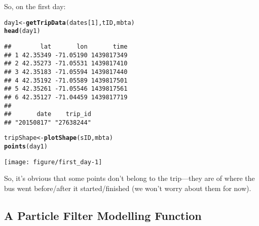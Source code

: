 \documentclass[11pt]{article}\usepackage[]{graphicx}\usepackage[]{color}
\makeatletter
\def\maxwidth{ %
  \ifdim\Gin@nat@width>\linewidth
    \linewidth
  \else
    \Gin@nat@width
  \fi
}
\newcommand{\hlnum}[1]{\textcolor[rgb]{0.686,0.059,0.569}{#1}}%
\newcommand{\hlstd}[1]{\textcolor[rgb]{0.345,0.345,0.345}{#1}}%
\newcommand{\hlkwb}[1]{\textcolor[rgb]{0.69,0.353,0.396}{#1}}%
\newcommand{\hlkwd}[1]{\textcolor[rgb]{0.737,0.353,0.396}{\textbf{#1}}}%
\newenvironment{kframe}{%
 \def\at@end@of@kframe{}%
 \ifinner\ifhmode%
  \def\at@end@of@kframe{\end{minipage}}%
  \begin{minipage}{\columnwidth}%
 \fi\fi%
 \def\FrameCommand##1{\hskip\@totalleftmargin \hskip-\fboxsep
 \colorbox{shadecolor}{##1}\hskip-\fboxsep
     \hskip-\linewidth \hskip-\@totalleftmargin \hskip\columnwidth}%
 \MakeFramed {\advance\hsize-\width
   \@totalleftmargin\z@ \linewidth\hsize
   \@setminipage}}%
 {\par\unskip\endMakeFramed%
 \at@end@of@kframe}
\newenvironment{knitrout}{}{} %
\makeatother
\begin{document}
So, on the first day:
\begin{knitrout}
\color{fgcolor}\begin{kframe}
\begin{alltt}
\hlstd{day1} \hlkwb{<-} \hlkwd{getTripData}\hlstd{(dates[}\hlnum{1}\hlstd{], tID, mbta)}
\hlkwd{head}\hlstd{(day1)}
\end{alltt}
\begin{verbatim}
##        lat       lon       time
## 1 42.35349 -71.05190 1439817349
## 2 42.35273 -71.05531 1439817410
## 3 42.35183 -71.05594 1439817440
## 4 42.35192 -71.05589 1439817501
## 5 42.35261 -71.05546 1439817561
## 6 42.35127 -71.04459 1439817719
## 
##       date    trip_id 
## "20150817" "27638244"
\end{verbatim}
\begin{alltt}
\hlstd{tripShape} \hlkwb{<-} \hlkwd{plotShape}\hlstd{(sID, mbta)}
\hlkwd{points}\hlstd{(day1)}
\end{alltt}
\end{kframe}

{\centering \texttt{[image: figure/first\_day-1]} 

}



\end{knitrout}

So, it's obvious that some points don't belong to the trip---they are of where the bus went
before/after it started/finished (we won't worry about them for now).

\subsection{A Particle Filter Modelling Function}
\end{document}
